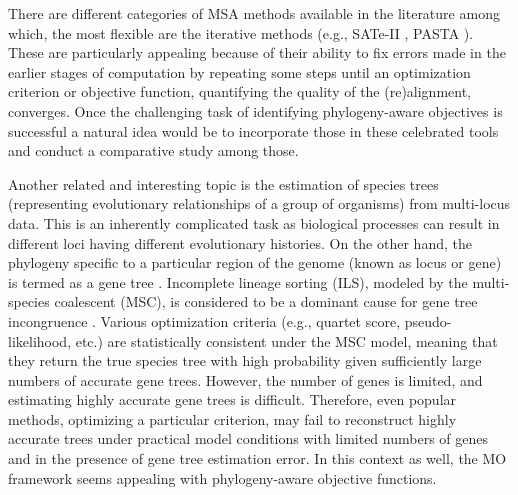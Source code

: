 There are different categories of MSA methods available in the literature among which, the most flexible are the iterative methods (e.g., SATe-II \cite{liu2012sate}, PASTA \cite{mirarab2015pasta}). These are particularly appealing because of their ability to fix errors made in the earlier stages of computation by repeating some steps until an optimization criterion or objective function, quantifying the quality of the (re)alignment, converges. Once the challenging task of identifying phylogeny-aware objectives is successful a natural idea would be to incorporate those in these celebrated tools and conduct a comparative study among those.    

Another related and interesting topic is the estimation of species trees (representing evolutionary relationships of a group of organisms) from multi-locus data. This is an inherently complicated task as biological processes can result in different loci having different evolutionary histories. On the other hand, the phylogeny specific to a particular region of the genome (known as locus or gene) is termed as a gene tree \cite{maddison1997gene}. Incomplete lineage sorting (ILS), modeled by the multi-species coalescent (MSC), is considered to be a dominant cause for gene tree incongruence \cite{mirarab2014evaluating, statistical-binning}. Various optimization criteria (e.g., quartet score, pseudo-likelihood, etc.) are statistically consistent under the MSC model, meaning that they return the true species tree with high probability given sufficiently large numbers of accurate gene trees. However, the number of genes is limited, and estimating highly accurate gene trees is difficult. Therefore, even popular methods, optimizing a particular criterion, may fail to reconstruct highly accurate trees under practical model conditions with limited numbers of genes and in the presence of gene tree estimation error. In this context as well, the MO framework seems appealing with phylogeny-aware objective functions.

